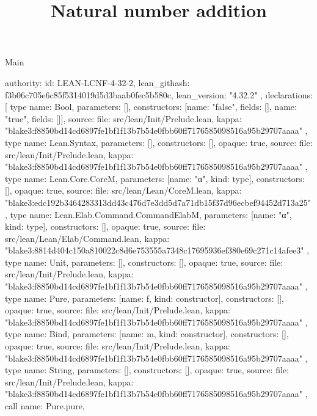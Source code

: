 \begin{lexlean}{Main}
\title{Natural number addition}
\begin{toolingmodule}
{
  authority: {
    id: LEAN-LCNF-4-32-2,
    lean_githash: f3b06c705e6c85f5314019d5d3baab0fec5b580c,
    lean_version: "4.32.2"
  },
  declarations: [
    type{
      name: Bool,
      parameters: [],
      constructors: [{name: "false", fields: []}, {name: "true", fields: []}],
      source: {
        file: src/lean/Init/Prelude.lean,
        kappa: "blake3:f8850bd14cd6897fe1bf1f13b7b54e0fbb60ff7176585098516a95b29707aaaa"
      }
    },
    type{
      name: Lean.Syntax,
      parameters: [],
      constructors: [],
      opaque: true,
      source: {
        file: src/lean/Init/Prelude.lean,
        kappa: "blake3:f8850bd14cd6897fe1bf1f13b7b54e0fbb60ff7176585098516a95b29707aaaa"
      }
    },
    type{
      name: Lean.Core.CoreM,
      parameters: [{name: "α", kind: type{}}],
      constructors: [],
      opaque: true,
      source: {
        file: src/lean/Lean/CoreM.lean,
        kappa: "blake3:edc192b3464283313dd43c476d7e3dd5d7a71db15f37d96ecbef94452d713a25"
      }
    },
    type{
      name: Lean.Elab.Command.CommandElabM,
      parameters: [{name: "α", kind: type{}}],
      constructors: [],
      opaque: true,
      source: {
        file: src/lean/Lean/Elab/Command.lean,
        kappa: "blake3:8814d404c150a810022c8d6e753555a7348c17695936ef380e69c271c14afee3"
      }
    },
    type{
      name: Unit,
      parameters: [],
      constructors: [],
      opaque: true,
      source: {
        file: src/lean/Init/Prelude.lean,
        kappa: "blake3:f8850bd14cd6897fe1bf1f13b7b54e0fbb60ff7176585098516a95b29707aaaa"
      }
    },
    type{
      name: Pure,
      parameters: [{name: f, kind: constructor{}}],
      constructors: [],
      opaque: true,
      source: {
        file: src/lean/Init/Prelude.lean,
        kappa: "blake3:f8850bd14cd6897fe1bf1f13b7b54e0fbb60ff7176585098516a95b29707aaaa"
      }
    },
    type{
      name: Bind,
      parameters: [{name: m, kind: constructor{}}],
      constructors: [],
      opaque: true,
      source: {
        file: src/lean/Init/Prelude.lean,
        kappa: "blake3:f8850bd14cd6897fe1bf1f13b7b54e0fbb60ff7176585098516a95b29707aaaa"
      }
    },
    type{
      name: String,
      parameters: [],
      constructors: [],
      opaque: true,
      source: {
        file: src/lean/Init/Prelude.lean,
        kappa: "blake3:f8850bd14cd6897fe1bf1f13b7b54e0fbb60ff7176585098516a95b29707aaaa"
      }
    },
    call{
      name: Pure.pure,
}}
\end{toolingmodule}
\end{lexlean}
